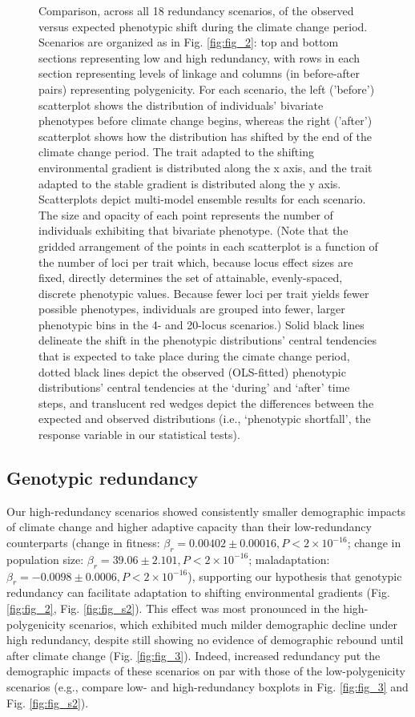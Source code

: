 \documentclass[9pt,twocolumn,twoside,lineno]{pnas-new}
\begin{document}
\begin{figure}
\caption{Comparison, across all 18 redundancy scenarios, of the observed versus expected phenotypic shift during the climate change period. Scenarios are organized as in Fig. \ref{fig:fig_2}: top and bottom sections representing low and high redundancy, with rows in each section representing levels of linkage and columns (in before-after pairs) representing polygenicity. For each scenario, the left ('before') scatterplot shows the distribution of individuals’ bivariate phenotypes before climate change begins, whereas the right ('after') scatterplot shows how the distribution has shifted by the end of the climate change period. The trait adapted to the shifting environmental gradient is distributed along the x axis, and the trait adapted to the stable gradient is distributed along the y axis. Scatterplots depict multi-model ensemble results for each scenario. The size and opacity of each point represents the number of individuals exhibiting that bivariate phenotype. (Note that the gridded arrangement of the points in each scatterplot is a function of the number of loci per trait which, because locus effect sizes are fixed, directly determines the set of attainable, evenly-spaced, discrete phenotypic values. Because fewer loci per trait yields fewer possible phenotypes, individuals are grouped into fewer, larger phenotypic bins in the 4- and 20-locus scenarios.) Solid black lines delineate the shift in the phenotypic distributions’ central tendencies that is expected to take place during the cimate change period, dotted black lines depict the observed (OLS-fitted) phenotypic distributions’ central tendencies at the ‘during’ and ‘after’ time steps, and translucent red wedges depict the differences between the expected and observed distributions (i.e., ‘phenotypic shortfall’, the response variable in our statistical tests).
}
\label{fig:fig_4}
\end{figure}
 

\subsection{Genotypic redundancy}
Our high-redundancy scenarios showed
consistently smaller demographic impacts of climate change and higher adaptive capacity
than their low-redundancy counterparts 
(change in fitness: $\beta_{r} = 0.00402\pm0.00016, P<2\times10^{-16}$;
change in population size: $\beta_{r} = 39.06\pm2.101, P<2\times10^{-16}$;
maladaptation: $\beta_{r} = -0.0098\pm0.0006, P<2\times10^{-16}$), supporting our hypothesis that
genotypic redundancy can facilitate adaptation to shifting environmental gradients (Fig. \ref{fig:fig_2}, Fig. \ref{fig:fig_s2}).
This effect was most pronounced in the high-polygenicity scenarios,
which exhibited much milder demographic decline under high redundancy,
despite still showing no evidence of demographic rebound until after climate change (Fig. \ref{fig:fig_3}).
Indeed, increased redundancy put the demographic
impacts of these scenarios on par with those
of the low-polygenicity scenarios (e.g., compare
low- and high-redundancy boxplots in Fig. \ref{fig:fig_3} and Fig. \ref{fig:fig_s2}).
\end{document}
